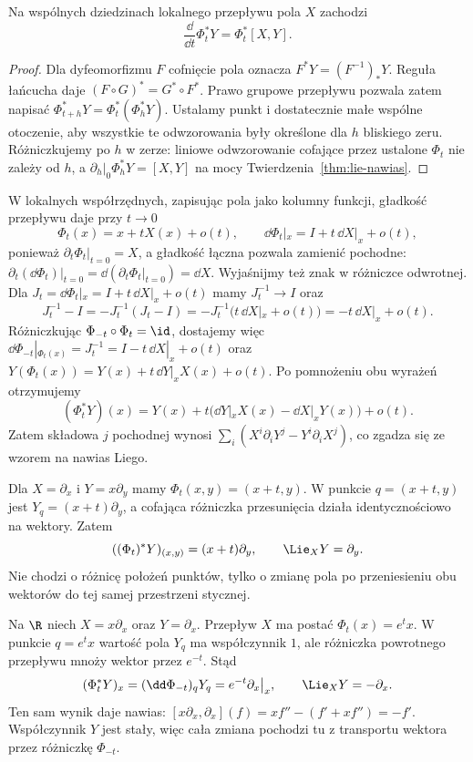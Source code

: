 \begin{stwierdzenie}\label{prop:lie-ewolucja}
Na wspólnych dziedzinach lokalnego przepływu pola $X$ zachodzi
\[
 \frac{\dd}{\dd t}\Phi_t^*Y=\Phi_t^*[X,Y].
\]
\end{stwierdzenie}
\begin{proof}
Dla dyfeomorfizmu $F$ cofnięcie pola oznacza $F^*Y=(F^{-1})_*Y$.
Reguła łańcucha daje $(F\circ G)^*=G^*\circ F^*$.
Prawo grupowe przepływu pozwala zatem napisać
$\Phi_{t+h}^*Y=\Phi_t^*(\Phi_h^*Y)$.
Ustalamy punkt i dostatecznie małe wspólne otoczenie, aby
wszystkie te odwzorowania były określone dla $h$ bliskiego zeru.
Różniczkujemy po $h$ w zerze: liniowe odwzorowanie cofające przez
ustalone $\Phi_t$ nie zależy od $h$, a
$\left.\partial_h\right|_0\Phi_h^*Y=[X,Y]$
na mocy Twierdzenia~\ref{thm:lie-nawias}.
\end{proof}

\begin{uwaga}
W lokalnych współrzędnych, zapisując pola jako kolumny funkcji,
gładkość przepływu daje przy $t\to0$
\[
 \Phi_t(x)=x+tX(x)+o(t),\qquad
 \dd\Phi_t|_x=I+t\,\dd X|_x+o(t),
\]
ponieważ $\partial_t\Phi_t|_{t=0}=X$,
a gładkość łączna pozwala zamienić pochodne:
$\partial_t(\dd\Phi_t)|_{t=0}
=\dd(\partial_t\Phi_t|_{t=0})=\dd X$.
Wyjaśnijmy też znak w różniczce odwrotnej.
Dla $J_t=\dd\Phi_t|_x=I+t\,\dd X|_x+o(t)$
mamy $J_t^{-1}\to I$ oraz
\[
 J_t^{-1}-I=-J_t^{-1}(J_t-I)
 =-J_t^{-1}\bigl(t\,\dd X|_x+o(t)\bigr)
 =-t\,\dd X|_x+o(t).
\]
Różniczkując $\Phi_{-t}\circ\Phi_t=\id$, dostajemy więc
$\dd\Phi_{-t}|_{\Phi_t(x)}=J_t^{-1}
=I-t\,\dd X|_x+o(t)$ oraz
$Y(\Phi_t(x))=Y(x)+t\,\dd Y|_xX(x)+o(t)$.
Po pomnożeniu obu wyrażeń otrzymujemy
\[
 (\Phi_t^*Y)(x)=Y(x)+t\bigl(\dd Y|_xX(x)-\dd X|_xY(x)\bigr)+o(t).
\]
Zatem składowa $j$ pochodnej wynosi
$\sum_i(X^i\partial_iY^j-Y^i\partial_iX^j)$,
co zgadza się ze wzorem na nawias Liego.
\end{uwaga}

\begin{przyklad}
Dla $X=\partial_x$ i $Y=x\partial_y$ mamy
$\Phi_t(x,y)=(x+t,y)$. W punkcie $q=(x+t,y)$ jest
$Y_q=(x+t)\partial_y$, a cofająca różniczka przesunięcia
działa identycznościowo na wektory. Zatem
\[
 ((\Phi_t)^*Y)_{(x,y)}=(x+t)\partial_y,
 \qquad \Lie_XY=\partial_y.
\]
Nie chodzi o różnicę położeń punktów, tylko o zmianę pola
po przeniesieniu obu wektorów do tej samej przestrzeni stycznej.
\end{przyklad}

\begin{przyklad}
Na $\R$ niech $X=x\partial_x$ oraz $Y=\partial_x$.
Przepływ $X$ ma postać $\Phi_t(x)=e^t x$.
W punkcie $q=e^t x$ wartość pola $Y_q$ ma współczynnik $1$,
ale różniczka powrotnego przepływu mnoży wektor przez $e^{-t}$.
Stąd
\[
(\Phi_t^*Y)_x=(\dd\Phi_{-t})_qY_q=e^{-t}\partial_x\big|_x,
\qquad \Lie_XY=-\partial_x.
\]
Ten sam wynik daje nawias:
$[x\partial_x,\partial_x](f)=xf''-(f'+xf'')=-f'$.
Współczynnik $Y$ jest stały, więc cała zmiana pochodzi tu z
transportu wektora przez różniczkę $\Phi_{-t}$.
\end{przyklad}

